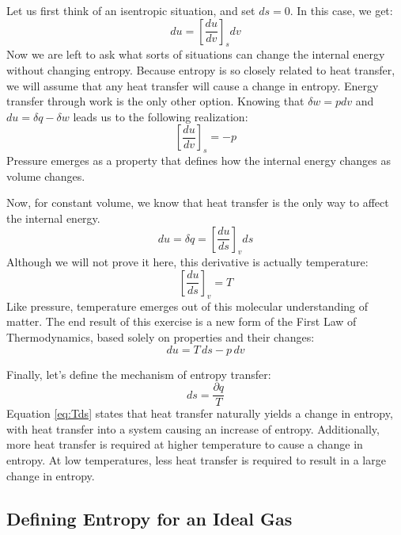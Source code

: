 Let us first think of an isentropic situation, and set $ds = 0$.  In this case, we get:
\begin{equation*}
  du = \left[\frac{d u}{d v}\right]_s dv
\end{equation*}
Now we are left to ask what sorts of situations can change the internal energy without changing entropy.  Because entropy is so closely related to heat transfer, we will assume that any heat transfer will cause a change in entropy.  Energy transfer through work is the only other option.  Knowing that $\delta w = p dv$ and $du = \delta q - \delta w$ leads us to the following realization:
\begin{equation} \label{eq:statMechPressure}
  \left[\frac{d u}{d v}\right]_s = -p
\end{equation}
Pressure emerges as a property that defines how the internal energy changes as volume changes.

Now, for constant volume, we know that heat transfer is the only way to affect the internal energy.
\begin{equation*}
  du = \delta q = \left[\frac{d u}{d s}\right]_v ds
\end{equation*}
Although we will not prove it here, this derivative is actually temperature:
\begin{equation} \label{eq:statMechPressure}
  \left[\frac{d u}{d s}\right]_v = T
\end{equation}
Like pressure, temperature emerges out of this molecular understanding of matter.  The end result of this exercise is a new form of the First Law of Thermodynamics, based solely on properties and their changes:
\begin{equation} \label{eq:FirstLawRevisited}
  du = T\,ds - p\,dv
\end{equation}

Finally, let's define the mechanism of entropy transfer:
\begin{equation} \label{eq:Tds}
  ds = \frac{\partial q}{T}
\end{equation}
Equation \ref{eq:Tds} states that heat transfer naturally yields a change in entropy, with heat transfer into a system causing an increase of entropy.
Additionally, more heat transfer is required at higher temperature to cause a change in entropy.  At low temperatures, less heat transfer is required to result in a large change in entropy.

\subsection{Defining Entropy for an Ideal Gas}

